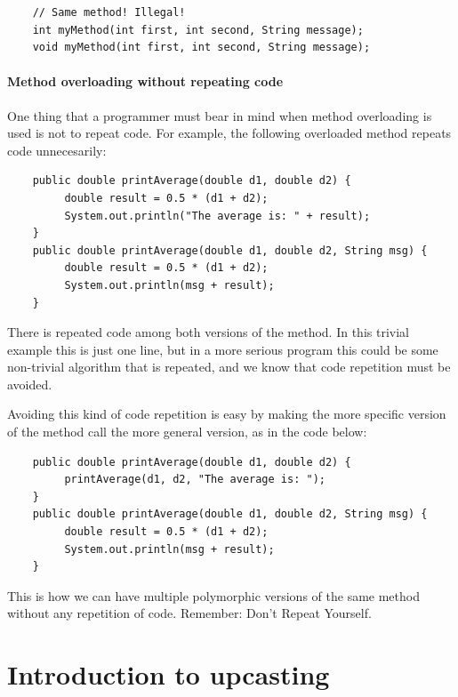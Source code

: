 \begin{verbatim}
    // Same method! Illegal!
    int myMethod(int first, int second, String message);
    void myMethod(int first, int second, String message);
\end{verbatim}

\paragraph{Method overloading without repeating code}
\label{sec:meth-overl-with}

One thing that a programmer must bear in mind when method overloading
is used is not to repeat code. For example, the following overloaded
method repeats code unnecesarily: 

\begin{verbatim}
    public double printAverage(double d1, double d2) {
         double result = 0.5 * (d1 + d2);
         System.out.println("The average is: " + result);
    }
    public double printAverage(double d1, double d2, String msg) {
         double result = 0.5 * (d1 + d2);
         System.out.println(msg + result);
    }
\end{verbatim}

There is repeated code among both versions of the method. In this
trivial example this is just one line, but in a more serious program
this could be some non-trivial algorithm that is repeated, and we know
that code repetition must be avoided. 

Avoiding this kind of code repetition is easy by making the more
specific version of the method call the more general version, as in
the code below: 

\begin{verbatim}
    public double printAverage(double d1, double d2) {
         printAverage(d1, d2, "The average is: ");
    }
    public double printAverage(double d1, double d2, String msg) {
         double result = 0.5 * (d1 + d2);
         System.out.println(msg + result);
    }
\end{verbatim}

This is how we can have multiple polymorphic versions of the same
method without any repetition of code. Remember: Don't Repeat
Yourself. 

\section{Introduction to upcasting}
\label{sec:upcasting}

